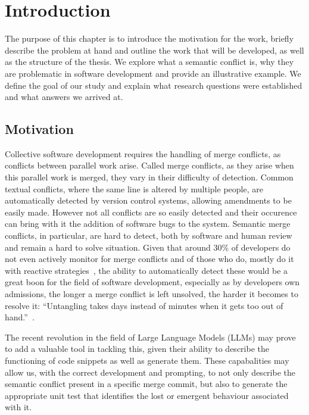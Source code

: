 \chapter{Introduction} \label{chap:intro}

The purpose of this chapter is to introduce the motivation for the work, briefly describe the problem at hand and outline the work that will be developed, as well as the structure of the thesis.
We explore what a semantic conflict is, why they are problematic in software development and provide an illustrative example.
We define the goal of our study and explain what research questions were established and what answers we arrived at.

\section{Motivation} \label{sec:motivation}

Collective software development requires the handling of merge conflicts, as conflicts between parallel work arise. Called merge conflicts, as they arise when this parallel work is merged, they vary in their difficulty of detection.
Common textual conflicts, where the same line is altered by multiple people, are automatically detected by version control systems, allowing amendments to be easily made. However not all conflicts are so easily detected and their occurence can bring with it the addition of software bugs to the system. Semantic merge conflicts, in particular, are hard to detect, both by software and human review and remain a hard to solve situation. Given that around 30\% of developers do not even actively monitor for merge conflicts and of those who do, mostly do it with reactive strategies~\cite{kn:lifecycle}, the ability to automatically detect these would be a great boon for the field of software development, especially as by developers own admissions, the longer a merge conflict is left unsolved, the harder it becomes to resolve it: ``Untangling takes days instead of minutes when it gets too out of hand.''~\cite{kn:lifecycle}.

The recent revolution in the field of Large Language Models (LLMs) may prove to add a valuable tool in tackling this, given their ability to describe the functioning of code snippets as well as generate them. These capabalities may allow us, with the correct development and prompting, to not only describe the semantic conflict present in a specific merge commit, but also to generate the appropriate unit test that identifies the lost or emergent behaviour associated with it.


